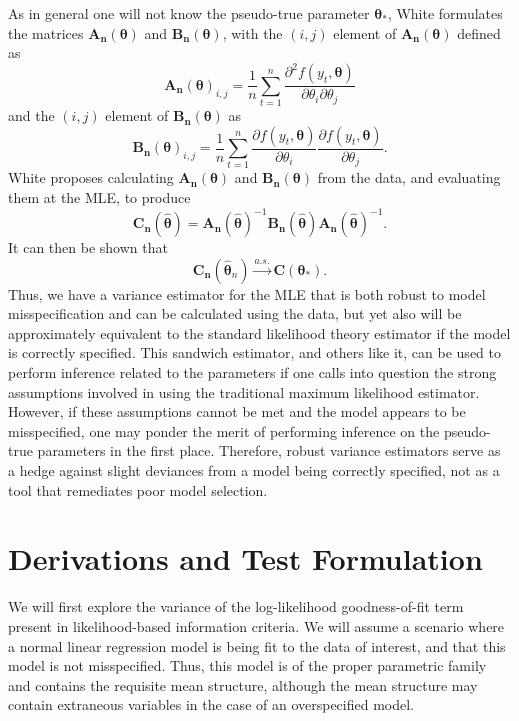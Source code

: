 \documentclass[sn-mathphys-ay]{sn-jnl}
\begin{document}
		As in general one will not know the pseudo-true parameter $\bm{\theta}_*$, White formulates the matrices $\bm{A_n}(\bm{\theta})$ and $\bm{B_n}(\bm{\theta})$, with the $(i,j)$ element of $\bm{A_n}(\bm{\theta})$ defined as
		\begin{equation*}
			\bm{A_n}(\bm{\theta})_{i,j} = \frac{1}{n} \sum_{t=1}^{n} \frac{\partial^2 f(y_t,\bm{\theta})}{\partial \theta_i \partial \theta_j}
		\end{equation*}
		and the $(i,j)$ element of $\bm{B_n}(\bm{\theta})$ as
		\begin{equation*}
			\bm{B_n}(\bm{\theta})_{i,j} = \frac{1}{n} \sum_{t=1}^{n} \frac{\partial f(y_t,\bm{\theta})}{\partial \theta_i} \frac{\partial f(y_t,\bm{\theta})}{\partial \theta_j} .
		\end{equation*}
		White proposes calculating $\bm{A_n}(\bm{\theta})$ and $\bm{B_n}(\bm{\theta})$ from the data, and evaluating them at the MLE, to produce
		\begin{equation*}
			\bm{C_n}(\hat{\bm{\theta}}) = \bm{A_n}(\hat{\bm{\theta}})^{-1} \bm{B_n}(\hat{\bm{\theta}}) \bm{A_n}(\hat{\bm{\theta}})^{-1} .
		\end{equation*}
		It can then be shown that 
		\begin{equation*}
			\bm{C_n}(\hat{\bm{\theta}}_n) \xrightarrow[]{a.s.} \bm{C}(\bm{\theta}_* ) .
		\end{equation*}
		Thus, we have a variance estimator for the MLE that is both robust to model misspecification and can be calculated using the data, but yet also will be approximately equivalent to the standard
		likelihood theory estimator if the model is correctly specified. This sandwich estimator, and others like it, can be used to perform inference related to the parameters if one calls into question
		the strong assumptions involved in using the traditional maximum likelihood estimator. However, if these assumptions cannot be met and the model appears to be misspecified, one may ponder
		the merit of performing inference on the pseudo-true parameters in the first place. Therefore, robust variance estimators serve as a hedge against slight deviances from a model
		being correctly specified, not as a tool that remediates poor model selection.

\section{Derivations and Test Formulation}
		
		We will first explore the variance of the log-likelihood goodness-of-fit term present in likelihood-based information criteria. We will assume a
		scenario where a normal linear regression model is being fit to the data of interest, and that this model is not misspecified. Thus, this model is of the proper
		parametric family and contains the requisite mean structure, although the mean structure may contain extraneous variables in the
		case of an overspecified model.
\end{document}
